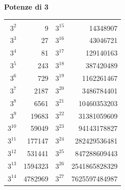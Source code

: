 \bigskip
\begin{center}
\textbf{Potenze di 3}\\[6pt]
\small
\renewcommand{\arraystretch}{1.05}
\begin{tabular}{rr@{\qquad\qquad}rr}
\toprule
\multicolumn{2}{c}{} & \multicolumn{2}{c}{} \\[-12pt]
$3^{2}$ & 9 & $3^{15}$ & 14348907 \\
$3^{3}$ & 27 & $3^{16}$ & 43046721 \\
$3^{4}$ & 81 & $3^{17}$ & 129140163 \\
$3^{5}$ & 243 & $3^{18}$ & 387420489 \\
$3^{6}$ & 729 & $3^{19}$ & 1162261467 \\
$3^{7}$ & 2187 & $3^{20}$ & 3486784401 \\
$3^{8}$ & 6561 & $3^{21}$ & 10460353203 \\
$3^{9}$ & 19683 & $3^{22}$ & 31381059609 \\
$3^{10}$ & 59049 & $3^{23}$ & 94143178827 \\
$3^{11}$ & 177147 & $3^{24}$ & 282429536481 \\
$3^{12}$ & 531441 & $3^{25}$ & 847288609443 \\
$3^{13}$ & 1594323 & $3^{26}$ & 2541865828329 \\
$3^{14}$ & 4782969 & $3^{27}$ & 7625597484987 \\
\bottomrule
\end{tabular}
\end{center}


